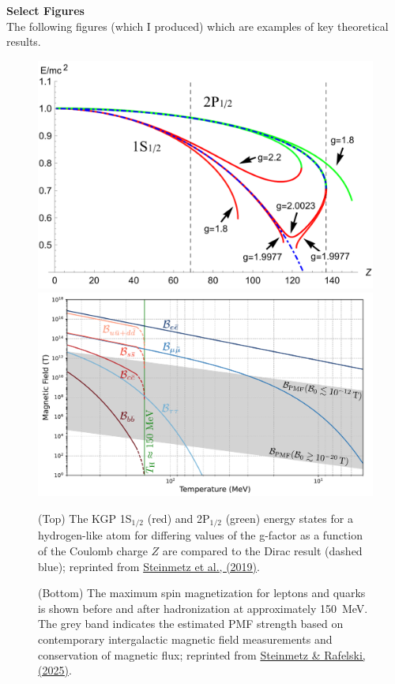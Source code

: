 \documentclass[11pt]{article}
\begin{document}
\newpage

{\noindent\Large\textbf{Select Figures}}\\
The following figures (which I produced) which are examples of key theoretical results.
\begin{figure}[h!]
    \centering
        \includegraphics[width=0.74\linewidth]{Figure_1.pdf}\\
        \includegraphics[width=0.80\linewidth]{Figure_2.pdf}
    \caption{(Top) The KGP 1S\(_{1/2}\) (red) and 2P\(_{1/2}\) (green) energy states for a hydrogen-like atom for differing values of the g-factor as a function of the Coulomb charge \(Z\) are compared to the Dirac result (dashed blue); reprinted from \href{https://doi.org/10.1140/epja/i2019-12715-5}{Steinmetz et al., (2019)}.}
    \label{fig:figure1}
    \caption{(Bottom) The maximum spin magnetization for leptons and quarks is shown before and after hadronization at approximately 150~MeV. The grey band indicates the estimated PMF strength based on contemporary intergalactic magnetic field measurements and conservation of magnetic flux; reprinted from \href{https://doi.org/10.48550/arXiv.2502.05052}{Steinmetz \& Rafelski, (2025)}.}
    \label{fig:figure2}
\end{figure}
\end{document}

